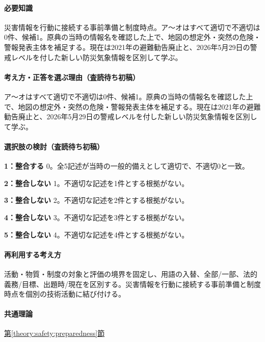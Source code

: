 \paragraph{必要知識} 災害情報を行動に接続する事前準備と制度時点。ア〜オはすべて適切で不適切は0件、候補1。原典の当時の情報名を確認した上で、地図の想定外・突然の危険・警報発表主体を補足する。現在は2021年の避難勧告廃止と、2026年5月29日の警戒レベルを付した新しい防災気象情報を区別して学ぶ。

\paragraph{考え方・正答を選ぶ理由（査読待ち初稿）} ア〜オはすべて適切で不適切は0件、候補1。原典の当時の情報名を確認した上で、地図の想定外・突然の危険・警報発表主体を補足する。現在は2021年の避難勧告廃止と、2026年5月29日の警戒レベルを付した新しい防災気象情報を区別して学ぶ。

\paragraph{選択肢の検討（査読待ち初稿）}\mbox{}\par

\noindent\textbf{1：整合する} 0。全5記述が当時の一般的備えとして適切で、不適切0と一致。\par

\noindent\textbf{2：整合しない} 1。不適切な記述を1件とする根拠がない。\par

\noindent\textbf{3：整合しない} 2。不適切な記述を2件とする根拠がない。\par

\noindent\textbf{4：整合しない} 3。不適切な記述を3件とする根拠がない。\par

\noindent\textbf{5：整合しない} 4。不適切な記述を4件とする根拠がない。\par

\paragraph{再利用する考え方} 活動・物質・制度の対象と評価の境界を固定し、用語の入替、全部/一部、法的義務/目標、出題時/現在を区別する。災害情報を行動に接続する事前準備と制度時点を個別の技術活動に結び付ける。

\paragraph{共通理論} \hyperref[theory:safety:preparedness]{第\ref*{theory:safety:preparedness}節}

